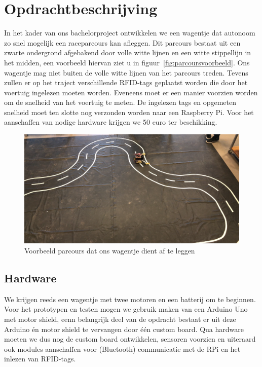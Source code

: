 \section{Opdrachtbeschrijving}
In het kader van ons bachelorproject ontwikkelen we een wagentje dat autonoom zo snel mogelijk een raceparcours kan afleggen. Dit parcours bestaat uit een zwarte ondergrond afgebakend door volle witte lijnen en een witte stippellijn in het midden, een voorbeeld hiervan ziet u in figuur~\vref{fig:parcoursvoorbeeld}. Ons wagentje mag niet buiten de volle witte lijnen van het parcours treden. Tevens zullen er op het traject verschillende RFID-tags geplaatst worden die door het voertuig ingelezen moeten worden. Eveneens moet er een manier voorzien worden om de snelheid van het voertuig te meten. De ingelezen tags en opgemeten snelheid moet ten slotte nog verzonden worden naar een Raspberry Pi. Voor het aanschaffen van nodige hardware krijgen we 50 euro ter beschikking.\\
\begin{figure}[H]
	\centering
	\includegraphics[width=\textwidth]{parcoursvoorbeeld.png}
	\caption{Voorbeeld parcours dat ons wagentje dient af te leggen}
	\label{fig:parcoursvoorbeeld}
\end{figure}
\subsection{Hardware}
We krijgen reeds een wagentje met twee motoren en een batterij om te beginnen.
Voor het prototypen en testen mogen we gebruik maken van een Arduino Uno met motor shield, eenn belangrijk deel van de opdracht bestaat er uit deze Arduino \'en motor shield te vervangen door \'e\'en custom board.
Qua hardware moeten we dus nog de custom board ontwikkelen, sensoren voorzien en uiteraard ook modules aanschaffen voor (Bluetooth) communicatie met de RPi en het inlezen van RFID-tags.\\
